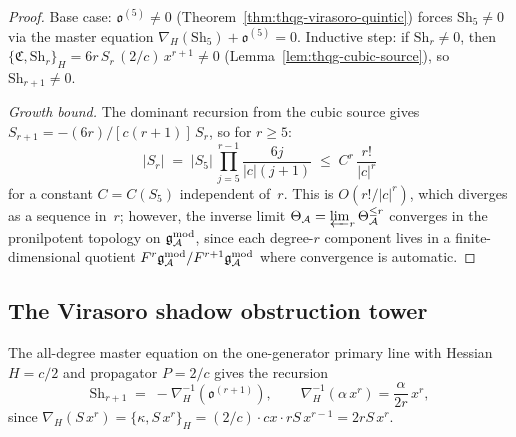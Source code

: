 \begin{proof}
Base case: $\mathfrak{o}^{(5)} \neq 0$
(Theorem~\ref{thm:thqg-virasoro-quintic}) forces
$\mathrm{Sh}_5 \neq 0$ via the master equation
$\nabla_H(\mathrm{Sh}_5) + \mathfrak{o}^{(5)} = 0$.
Inductive step: if $\mathrm{Sh}_r \neq 0$, then
$\{\mathfrak{C}, \mathrm{Sh}_r\}_H =
6r\,S_r\,(2/c)\,x^{r+1} \neq 0$
(Lemma~\ref{lem:thqg-cubic-source}), so
$\mathrm{Sh}_{r+1} \neq 0$.

\smallskip\noindent
\emph{Growth bound.}
The dominant recursion from the cubic source gives
$S_{r+1} = -(6r)/[c(r+1)]\,S_r$, so for $r \geq 5$:
\[
|S_r|
\;=\;
|S_5|\,\prod_{j=5}^{r-1} \frac{6j}{|c|(j+1)}
\;\leq\;
C^r\,\frac{r!}{|c|^r}
\]
for a constant $C = C(S_5)$ independent of~$r$. This is
$O(r!/|c|^r)$, which diverges as a sequence in~$r$; however,
the inverse limit $\Theta_{\mathcal{A}} = \varprojlim_r \Theta_{\mathcal{A}}^{\leq r}$
converges in the pronilpotent topology on $\mathfrak{g}_{\mathcal{A}}^{\mathrm{mod}}$, since
each degree-$r$ component lives in a finite-dimensional quotient
$F^r\mathfrak{g}_{\mathcal{A}}^{\mathrm{mod}}/F^{r+1}\mathfrak{g}_{\mathcal{A}}^{\mathrm{mod}}$ where convergence is automatic.
\end{proof}



\subsection{The Virasoro shadow obstruction tower}
\label{subsec:thqg-virasoro-tower}

The all-degree master equation on the one-generator primary line
with Hessian $H = c/2$ and propagator $P = 2/c$ gives the
recursion
\begin{equation}\label{eq:thqg-master-recursion}
\mathrm{Sh}_{r+1}
\;=\;
-\nabla_H^{-1}(\mathfrak{o}^{(r+1)}),
\qquad
\nabla_H^{-1}(\alpha\,x^r)
= \frac{\alpha}{2r}\,x^r,
\end{equation}
since $\nabla_H(S\,x^r) = \{\kappa, S\,x^r\}_H =
(2/c)\cdot cx \cdot rS\,x^{r-1} = 2rS\,x^r$.

